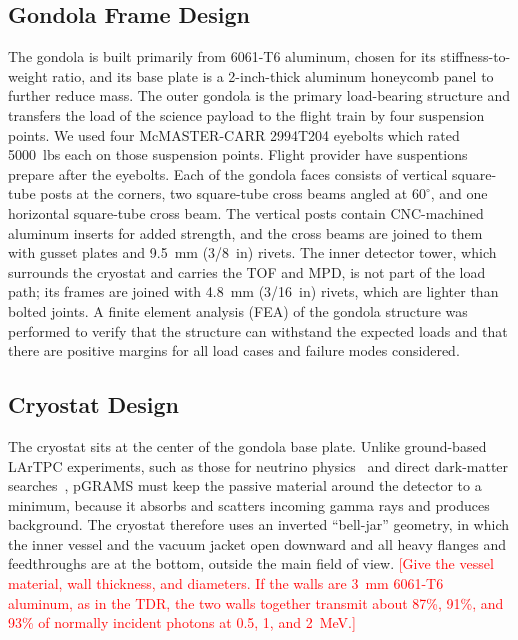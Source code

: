\documentclass[a4paper,fleqn,longmktitle]{cas-dc}
\begin{document}
\subsection{Gondola Frame Design}
\label{chap:engineer:gondola}
The gondola is built primarily from 6061-T6 aluminum, chosen for its stiffness-to-weight ratio, and its base plate is a 2-inch-thick aluminum honeycomb panel to further reduce mass.
The outer gondola is the primary load-bearing structure and transfers the load of the science payload to the flight train by four suspension points. We used four McMASTER-CARR 2994T204 eyebolts which rated 5000~lbs each on those suspension points. Flight provider have suspentions prepare after the eyebolts.
Each of the gondola faces consists of vertical square-tube posts at the corners, two square-tube cross beams angled at $60^{\circ}$, and one horizontal square-tube cross beam.
The vertical posts contain CNC-machined aluminum inserts for added strength, and the cross beams are joined to them with gusset plates and 9.5~mm (3/8~in) rivets.
The inner detector tower, which surrounds the cryostat and carries the TOF and MPD, is not part of the load path; its frames are joined with 4.8~mm (3/16~in) rivets, which are lighter than bolted joints.
A finite element analysis (FEA) of the gondola structure was performed to verify that the structure can withstand the expected loads and that there are positive margins for all load cases and failure modes considered.
 
\subsection{Cryostat Design}\label{chap:engineer:cryostat}
The cryostat sits at the center of the gondola base plate.
Unlike ground-based LArTPC experiments, such as those for neutrino physics~\cite{abi2020deepundergroundneutrinoexperiment} and direct dark-matter searches~\cite{agnes2015darkside}, pGRAMS must keep the passive material around the detector to a minimum, because it absorbs and scatters incoming gamma rays and produces background.
The cryostat therefore uses an inverted ``bell-jar'' geometry, in which the inner vessel and the vacuum jacket open downward and all heavy flanges and feedthroughs are at the bottom, outside the main field of view.
\textcolor{red}{[Give the vessel material, wall thickness, and diameters. If the walls are 3~mm 6061-T6 aluminum, as in the TDR, the two walls together transmit about 87\%, 91\%, and 93\% of normally incident photons at 0.5, 1, and 2~MeV.]}
 
\end{document}
